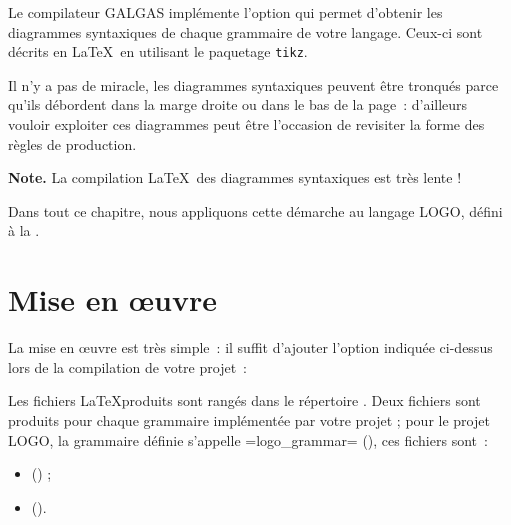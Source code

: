 



Le compilateur GALGAS implémente l'option  qui permet d'obtenir les diagrammes syntaxiques de chaque grammaire de votre langage. Ceux-ci sont décrits en \LaTeX~en utilisant le paquetage \texttt{tikz}\label{tikz}. %

Il n'y a pas de miracle, les diagrammes syntaxiques peuvent être tronqués parce qu'ils débordent dans la marge droite ou dans le bas de la page~: d'ailleurs vouloir exploiter ces diagrammes peut être l'occasion de revisiter la forme des règles de production.

{\bf Note.} La compilation \LaTeX~des diagrammes syntaxiques est très lente !

Dans tout ce chapitre, nous appliquons cette démarche au langage LOGO, défini à la .

\section{Mise en œuvre}

La mise en œuvre est très simple~: il suffit d'ajouter l'option indiquée ci-dessus lors de la compilation de votre projet~:
\begin{description}
  \item[ ] 
\end{description}

Les fichiers \LaTeX produits sont rangés dans le répertoire . Deux fichiers sont produits pour chaque grammaire implémentée par votre projet ; pour le projet LOGO, la grammaire définie s'appelle \ggsq=logo_grammar= (), ces fichiers sont~:
\begin{itemize}
\item {} () ;
\item {} ().
\end{itemize}


